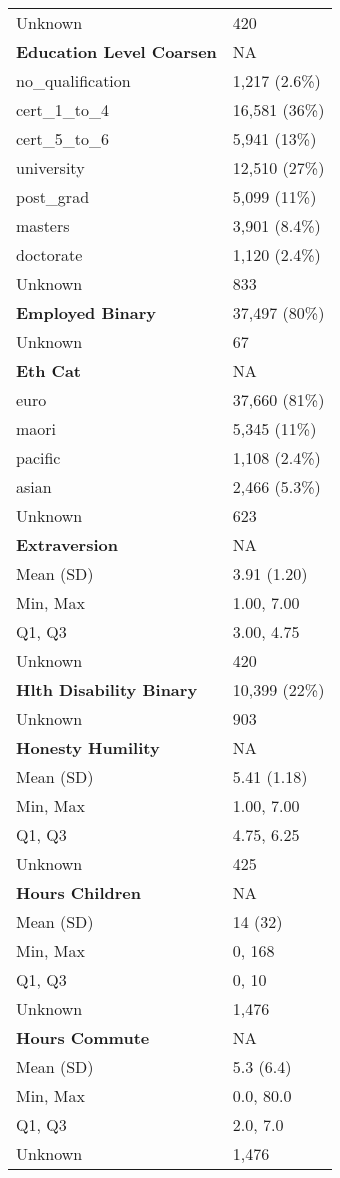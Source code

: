 \documentclass[
  single column]{article}
\begin{document}
\begin{longtable}[]{@{}ll@{}}
Unknown & 420 \\
\textbf{Education Level Coarsen} & NA \\
no\_qualification & 1,217 (2.6\%) \\
cert\_1\_to\_4 & 16,581 (36\%) \\
cert\_5\_to\_6 & 5,941 (13\%) \\
university & 12,510 (27\%) \\
post\_grad & 5,099 (11\%) \\
masters & 3,901 (8.4\%) \\
doctorate & 1,120 (2.4\%) \\
Unknown & 833 \\
\textbf{Employed Binary} & 37,497 (80\%) \\
Unknown & 67 \\
\textbf{Eth Cat} & NA \\
euro & 37,660 (81\%) \\
maori & 5,345 (11\%) \\
pacific & 1,108 (2.4\%) \\
asian & 2,466 (5.3\%) \\
Unknown & 623 \\
\textbf{Extraversion} & NA \\
Mean (SD) & 3.91 (1.20) \\
Min, Max & 1.00, 7.00 \\
Q1, Q3 & 3.00, 4.75 \\
Unknown & 420 \\
\textbf{Hlth Disability Binary} & 10,399 (22\%) \\
Unknown & 903 \\
\textbf{Honesty Humility} & NA \\
Mean (SD) & 5.41 (1.18) \\
Min, Max & 1.00, 7.00 \\
Q1, Q3 & 4.75, 6.25 \\
Unknown & 425 \\
\textbf{Hours Children} & NA \\
Mean (SD) & 14 (32) \\
Min, Max & 0, 168 \\
Q1, Q3 & 0, 10 \\
Unknown & 1,476 \\
\textbf{Hours Commute} & NA \\
Mean (SD) & 5.3 (6.4) \\
Min, Max & 0.0, 80.0 \\
Q1, Q3 & 2.0, 7.0 \\
Unknown & 1,476 \\

\end{longtable}
\end{document}
